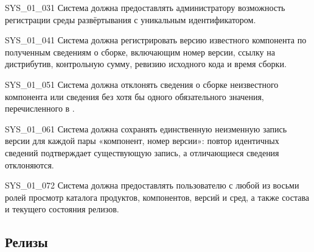 \documentclass{tpks}
\begin{document}
\begin{req}{SYS_01_03}{1}
Система должна предоставлять администратору возможность регистрации среды развёртывания с уникальным идентификатором.
\end{req}

\begin{req}{SYS_01_04}{1}
Система должна регистрировать версию известного компонента по полученным сведениям о сборке, включающим номер версии, ссылку на дистрибутив, контрольную сумму, ревизию исходного кода и время сборки.
\end{req}

\begin{req}{SYS_01_05}{1}
Система должна отклонять сведения о сборке неизвестного компонента или сведения без хотя бы одного обязательного значения, перечисленного в .
\end{req}

\begin{req}{SYS_01_06}{1}
Система должна сохранять единственную неизменную запись версии для каждой пары «компонент, номер версии»: повтор идентичных сведений подтверждает существующую запись, а отличающиеся сведения отклоняются.
\end{req}

\begin{req}{SYS_01_07}{2}
Система должна предоставлять пользователю с любой из восьми ролей просмотр каталога продуктов, компонентов, версий и сред, а также состава и текущего состояния релизов.
\end{req}

\subsection{Релизы}
\end{document}
